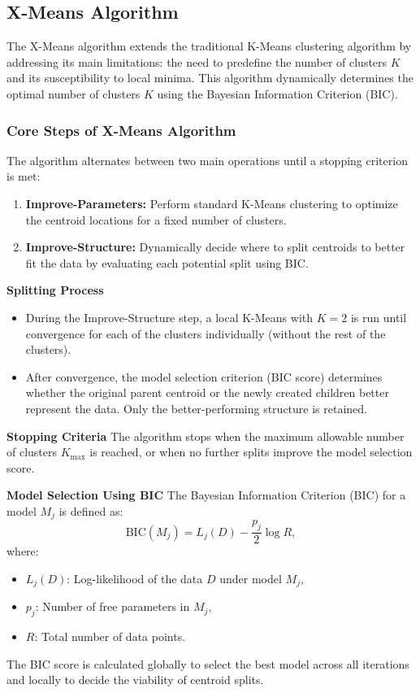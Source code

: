 \subsection{X-Means Algorithm}

The X-Means algorithm extends the traditional K-Means clustering algorithm by addressing its main limitations:
the need to predefine the number of clusters \( K \)
and its susceptibility to local minima. This algorithm dynamically determines the optimal number of clusters \( K \) using the Bayesian Information Criterion (BIC).

\subsubsection{Core Steps of X-Means Algorithm}

The algorithm alternates between two main operations until a stopping criterion is met:

\begin{enumerate}
    \item \textbf{Improve-Parameters:} Perform standard K-Means clustering to optimize the centroid locations for a fixed number of clusters.
    \item \textbf{Improve-Structure:} Dynamically decide where to split centroids to better fit the data by evaluating each potential split using BIC.
\end{enumerate}

\textbf{Splitting Process}
\begin{itemize}
    \item During the Improve-Structure step, a local K-Means with \( K = 2 \) is run until convergence for each of the clusters individually (without the rest of the clusters).
    \item After convergence, the model selection criterion (BIC score) determines whether the original parent centroid or the newly created children better represent the data. Only the better-performing structure is retained.
\end{itemize}

\textbf{Stopping Criteria}
The algorithm stops when the maximum allowable number of clusters \( K_{\text{max}} \) is reached, or when no further splits improve the model selection score.

\textbf{Model Selection Using BIC}
The Bayesian Information Criterion (BIC) for a model \( M_j \) is defined as:
\[
\text{BIC}(M_j) = L_j(D) - \frac{p_j}{2} \log R,
\]
where:
\begin{itemize}
    \item \( L_j(D) \): Log-likelihood of the data \( D \) under model \( M_j \),
    \item \( p_j \): Number of free parameters in \( M_j \),
    \item \( R \): Total number of data points.
\end{itemize}
The BIC score is calculated globally to select the best model across all iterations and locally to decide the viability of centroid splits.
